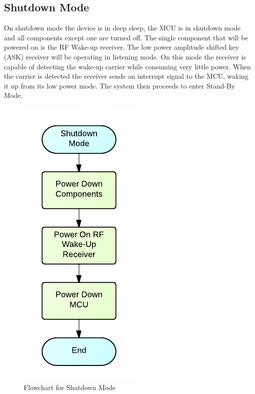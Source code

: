 \subsection{Shutdown Mode}
On shutdown mode the device is in deep sleep, the MCU is in shutdown mode and all components except one are turned off. The single component that will be powered on is the RF Wake-up receiver. The low power amplitude shifted key (ASK) receiver will be operating in listening mode. On this mode the receiver is capable of detecting the wake-up carrier while consuming very little power. When the carrier is detected the receiver sends an interrupt signal to the MCU, waking it up from its low power mode.  The system then proceeds to enter Stand-By Mode.
\begin{figure}[H]
	\centering
	\includegraphics[scale=1.0]{img/ShutdownMode}
	\caption{Flowchart for Shutdown Mode \label{fig:shutdownMode}}
\end{figure}

